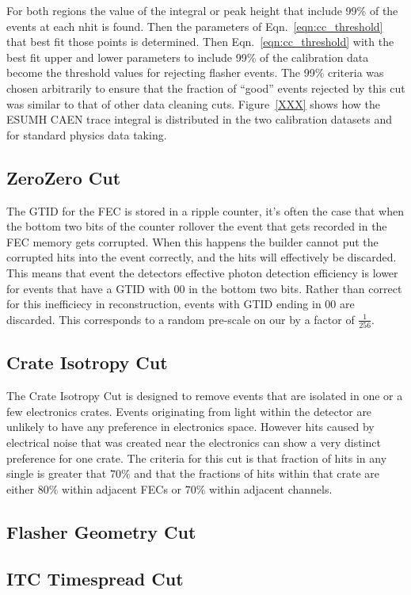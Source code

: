 For both regions the value of the integral or peak height that include
99\% of the events at each nhit is found. Then the parameters of
Eqn.~\ref{eqn:cc_threshold} that best fit those points is determined.
Then Eqn.~\ref{eqn:cc_threshold} with the best fit upper and lower
parameters to include 99\% of the calibration data become the threshold
values for rejecting flasher events.
The 99\% criteria was chosen arbitrarily to ensure that the fraction of
``good'' events rejected by this cut was similar to that of other data
cleaning cuts.
Figure~\ref{XXX} shows how the ESUMH CAEN trace integral is distributed
in the two calibration datasets and for standard physics data taking.



\subsection{ZeroZero Cut}
The GTID for the FEC is stored in a ripple counter, it's often the case that
when the bottom two bits of the counter rollover the event that gets recorded in
the FEC memory gets corrupted.
When this happens the builder cannot put the corrupted hits into the event correctly,
and the hits will effectively be discarded.
This means that event the detectors effective photon detection efficiency is lower
for events that have a GTID with $00$ in the bottom two bits.
Rather than correct for this inefficiecy in reconstruction, events with GTID
ending in $00$ are discarded. This corresponds to a random pre-scale
on our by a factor of $\frac{1}{256}$.
\subsection{Crate Isotropy Cut}
The Crate Isotropy Cut is designed to remove events that are isolated
in one or a few electronics crates.
Events originating from light within the detector are unlikely to have any
preference in electronics space.
However hits caused by electrical noise that was created near the electronics
can show a very distinct preference for one crate.
The criteria for this cut is that fraction of hits in any single
is greater that $70\%$ and that the fractions of hits within
that crate are either $80\%$ within adjacent FECs or $70\%$ within
adjacent channels.
\subsection{Flasher Geometry Cut}
\subsection{ITC Timespread Cut}

